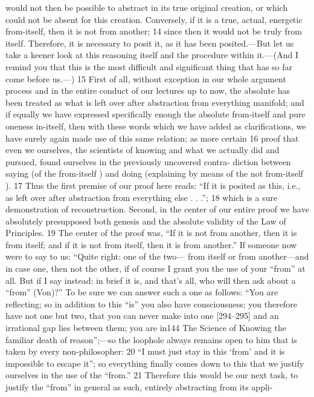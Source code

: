 would not then be possible to abstract in its true original creation, or which
could not be absent for this creation. Conversely, if it is a true, actual, energetic
from-itself, then it is not from another; 14 since then it would not be truly from
itself. Therefore, it is necessary to posit it, as it has been posited.—But let us
take a keener look at this reasoning itself and the procedure within it.—(And
I remind you that this is the most difficult and significant thing that has so far
come before us.—) 15 First of all, without exception in our whole argument
process and in the entire conduct of our lectures up to now, the absolute has
been treated as what is left over after abstraction from everything manifold;
and if equally we have expressed specifically enough the absolute from-itself
and pure oneness in-itself, then with these words which we have added as
clarifications, we have surely again made use of this same relation; as more
certain 16 proof that even we ourselves, the scientists of knowing and what we
actually did and pursued, found ourselves in the previously uncovered contra-
diction between saying (of the from-itself ) and doing (explaining by means of
the not from-itself ). 17 Thus the first premise of our proof here reads: “If it is
posited as this, i.e., as left over after abstraction from everything else . . .”; 18
which is a sure demonstration of reconstruction. Second, in the center of our
entire proof we have absolutely presupposed both genesis and the absolute
validity of the Law of Principles. 19 The center of the proof was, “If it is not
from another, then it is from itself; and if it is not from itself, then it is from
another.” If someone now were to say to us: “Quite right: one of the two—
from itself or from another—and in case one, then not the other, if of course
I grant you the use of your “from” at all. But if I say instead: in brief it is, and
that’s all, who will then ask about a “from” (Von)?” To be sure we can answer
such a one as follows: “You are reflecting; so in addition to this “is” you also
have consciousness; you therefore have not one but two, that you can never
make into one [294–295] and an irrational gap lies between them; you are in144
The Science of Knowing
the familiar death of reason”;—so the loophole always remains open to him
that is taken by every non-philosopher: 20 “I must just stay in this ‘from’ and it
is impossible to escape it”; so everything finally comes down to this that we
justify ourselves in the use of the “from.” 21 Therefore this would be our next
task, to justify the “from” in general as such, entirely abstracting from its appli-
